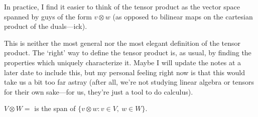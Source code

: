 \begin{dfn}
\begin{rmk}
\end{rmk}
\begin{rmk}
In practice, I find it easier to think of the tensor product as the vector space spanned by guys of the form $v\otimes w$ (as opposed to bilinear maps on the cartesian product of the duals---ick).
\end{rmk}
\begin{rmk}
This is neither the most general nor the most elegant definition of the tensor product.  The `right' way to define the tensor product is, as usual, by finding the properties which uniquely characterize it.  Maybe I will update the notes at a later date to include this, but my personal feeling right now is that this would take us a bit too far astray (after all, we're not studying linear algebra or tensors for their own sake---for us, they're just a tool to do calculus).
\end{rmk}
\end{dfn}
\begin{prp}\label{prp5.1.8}
$V\otimes W=$ is the span of $\{ v\otimes w:v\in V,\ w\in W\}$.
\end{prp}
